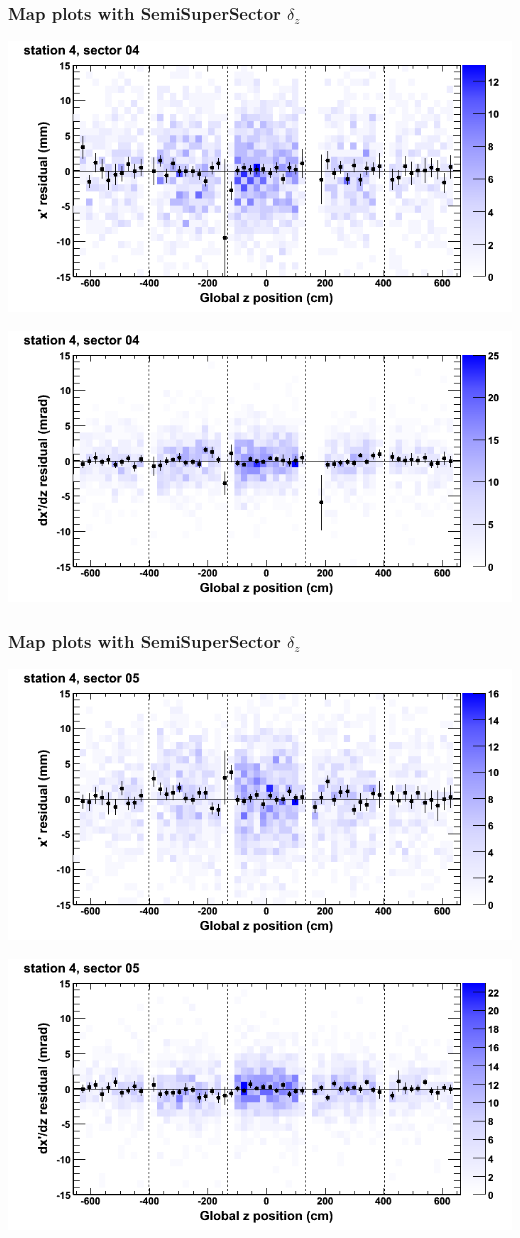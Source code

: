 \documentclass[compress]{beamer}
\begin{document}
\begin{frame}
\frametitle{Map plots with SemiSuperSector $\delta_z$}
\includegraphics[width=0.5\linewidth]{zfit_mapplots/DTvsz_st4sec04_x.png}

\includegraphics[width=0.5\linewidth]{zfit_mapplots/DTvsz_st4sec04_dxdz.png}
\end{frame}

\begin{frame}
\frametitle{Map plots with SemiSuperSector $\delta_z$}
\includegraphics[width=0.5\linewidth]{zfit_mapplots/DTvsz_st4sec05_x.png}

\includegraphics[width=0.5\linewidth]{zfit_mapplots/DTvsz_st4sec05_dxdz.png}
\end{frame}
\end{document}
